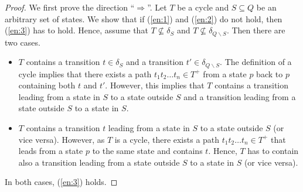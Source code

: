 \documentclass[runningheads]{llncs}
\begin{document}
\begin{proof}
  We first prove the direction ``$\Longrightarrow$''. Let $T$ be a
  cycle and $S\subseteq Q$ be an arbitrary set of states. We show that
  if (\ref{en:1}) and (\ref{en:2}) do not hold, then (\ref{en:3}) has
  to hold. Hence, assume that $T\not\subseteq\delta_S$ and
  $T\not\subseteq\delta_{Q\smallsetminus S}$. Then there are two
  cases.
  \begin{itemize}
  \item $T$ contains a transition $t\in\delta_S$ and a transition
    $t'\in\delta_{Q\smallsetminus S}$. The definition of a cycle
    implies that there exists a path $t_1t_2\ldots t_n\in T^+$ from a
    state $p$ back to $p$ containing both $t$ and $t'$. However, this
    implies that $T$ contains a transition leading from a state in $S$
    to a state outside $S$ and a transition leading from a state outside $S$
    to a state in $S$.
  \item $T$ contains a transition $t$ leading from a state in $S$ to a
    state outside $S$ (or vice versa). However, as $T$ is a cycle,
    there exists a path $t_1t_2\ldots t_n\in T^+$ that leads from a
    state $p$ to the same state and contains $t$. Hence, $T$ has to
    contain also a transition leading from a state outside $S$ to a
    state in $S$ (or vice versa).
  \end{itemize}
  In both cases, (\ref{en:3}) holds.


\end{proof}
\end{document}
